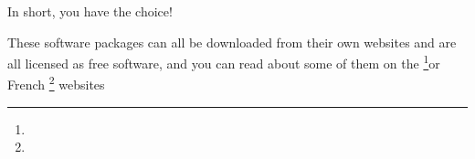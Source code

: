 

In short, you have the choice!



These software packages can all be downloaded from their own websites and are all licensed as \gls{free software}, and you can read about some of them on the \footnote{\urlFreeSoftwareDirectory{}}or French \footnote{\urlFramasoftLogiciels{}} websites

